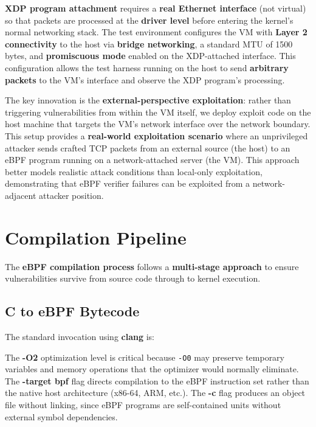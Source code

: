 \noindent
\textbf{XDP program attachment} requires a \textbf{real Ethernet interface} (not virtual) so that packets are processed at the \textbf{driver level} before entering the kernel's normal networking stack. The test environment configures the VM with \textbf{Layer 2 connectivity} to the host via \textbf{bridge networking}, a standard MTU of 1500 bytes, and \textbf{promiscuous mode} enabled on the XDP-attached interface. This configuration allows the test harness running on the host to send \textbf{arbitrary packets} to the VM's interface and observe the XDP program's processing.

\noindent
The key innovation is the \textbf{external-perspective exploitation}: rather than triggering vulnerabilities from within the VM itself, we deploy exploit code on the host machine that targets the VM's network interface over the network boundary. This setup provides a \textbf{real-world exploitation scenario} where an unprivileged attacker sends crafted TCP packets from an external source (the host) to an eBPF program running on a network-attached server (the VM). This approach better models realistic attack conditions than local-only exploitation, demonstrating that eBPF verifier failures can be exploited from a network-adjacent attacker position.

\section{Compilation Pipeline}

\noindent
The \textbf{eBPF compilation process} follows a \textbf{multi-stage approach} to ensure vulnerabilities survive from source code through to kernel execution.

\subsection{C to eBPF Bytecode}

\noindent
The standard invocation using \textbf{clang} is:

\vspace{0.3cm}
\noindent
{}
\vspace{0.3cm}

\noindent
The \textbf{-O2} optimization level is critical because \texttt{-O0} may preserve temporary variables and memory operations that the optimizer would normally eliminate. The \textbf{-target bpf} flag directs compilation to the eBPF instruction set rather than the native host architecture (x86-64, ARM, etc.). The \textbf{-c} flag produces an object file without linking, since eBPF programs are self-contained units without external symbol dependencies.

